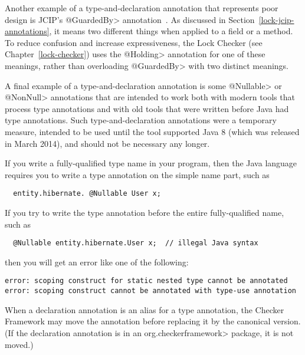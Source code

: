 Another example of a type-and-declaration annotation that represents poor
design is JCIP's \<@GuardedBy> annotation~\cite{Goetz2006}.  As discussed
in Section~\ref{lock-jcip-annotations}, it means two different things when
applied to a field or a method.  To reduce confusion and increase
expressiveness, the Lock Checker (see Chapter~\ref{lock-checker}) uses the
\<@Holding> annotation for one of these meanings, rather than overloading
\<@GuardedBy> with two distinct meanings.


A final example of a type-and-declaration annotation is some \<@Nullable>
or \<@NonNull> annotations that are intended to work both with modern tools
that process type annotations and with old tools that were written before
Java had type annotations.  Such type-and-declaration annotations were a
temporary measure, intended to be used until the tool supported Java 8
(which was released in March 2014), and
should not be necessary any longer.



If you write a fully-qualified type name in your program, then the Java
language requires you to write a type annotation on the simple name part,
such as
\begin{Verbatim}
  entity.hibernate. @Nullable User x;
\end{Verbatim}

If you try to write the type annotation before the entire fully-qualified
name, such as
\begin{Verbatim}
  @Nullable entity.hibernate.User x;  // illegal Java syntax
\end{Verbatim}
\noindent
then you will get an error like one of the following:
\begin{Verbatim}
error: scoping construct for static nested type cannot be annotated
error: scoping construct cannot be annotated with type-use annotation
\end{Verbatim}


\label{declaration-annotations-moved} %

When a declaration annotation is an alias for a type annotation, the
Checker Framework may move the annotation before replacing it by the
canonical version. (If the declaration annotation is in an \<org.checkerframework>
package, it is not moved.)

